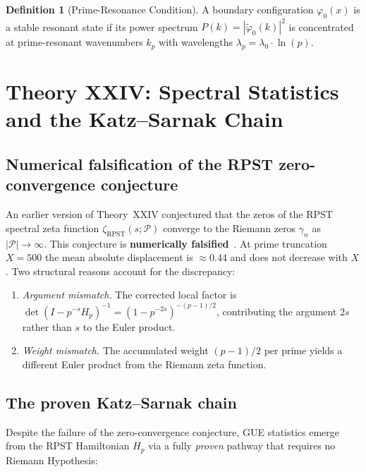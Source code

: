 \documentclass[12pt,oneside]{book}
\theoremstyle{definition}
\newtheorem{definition}{Definition}[chapter]
\begin{document}
\begin{definition}[Prime-Resonance Condition]
  A boundary configuration $\varphi_0(x)$ is a stable resonant state if its
  power spectrum $P(k) = |\tilde{\varphi}_0(k)|^2$ is concentrated at
  prime-resonant wavenumbers $k_p$ with wavelengths
  $\lambda_p = \lambda_0 \cdot \ln(p)$.
\end{definition}

\section{Theory XXIV: Spectral Statistics and the Katz--Sarnak Chain}

\subsection{Numerical falsification of the RPST zero-convergence conjecture}

An earlier version of Theory~XXIV conjectured that the zeros of the RPST
spectral zeta function $\zeta_{\mathrm{RPST}}(s; \mathcal{P})$ converge to the
Riemann zeros $\gamma_n$ as $|\mathcal{P}| \to \infty$.
This conjecture is \textbf{numerically falsified}~\cite{AlKahwati2026Numerical}.
At prime truncation $X = 500$ the mean absolute displacement is $\approx 0.44$
and does not decrease with $X$.  Two structural reasons account for the
discrepancy:

\begin{enumerate}
\item \emph{Argument mismatch.} The corrected local factor is
  $\det(I - p^{-s}H_p)^{-1} = (1 - p^{-2s})^{-(p-1)/2}$, contributing
  the argument $2s$ rather than $s$ to the Euler product.

\item \emph{Weight mismatch.} The accumulated weight $(p-1)/2$ per prime
  yields a different Euler product from the Riemann zeta function.
\end{enumerate}

\subsection{The proven Katz--Sarnak chain}

Despite the failure of the zero-convergence conjecture, GUE statistics
emerge from the RPST Hamiltonian $H_p$ via a fully \emph{proven} pathway
that requires no Riemann Hypothesis:
\end{document}
